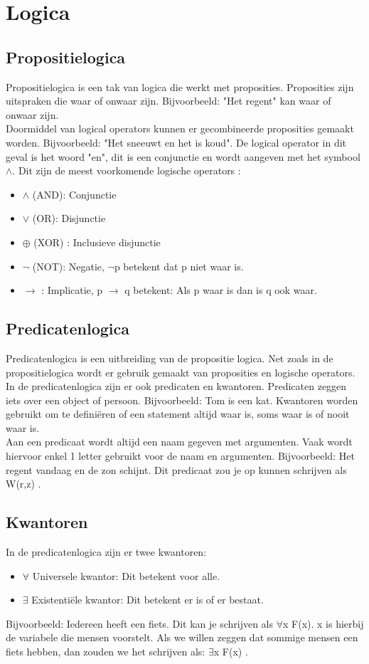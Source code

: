 \section{Logica}

\subsection{Propositielogica}
Propositielogica is een tak van logica die werkt met proposities. Proposities zijn uitspraken die waar of onwaar zijn. Bijvoorbeeld: "Het regent" kan waar of onwaar zijn. \\ Doormiddel van logical operators kunnen er gecombineerde proposities gemaakt worden. Bijvoorbeeld: "Het sneeuwt en het is koud". De logical operator in dit geval is het woord "en", dit is een conjunctie en wordt aangeven met het symbool $\wedge$. Dit zijn de meest voorkomende logische operators \cite{schaumsOutline}:
\begin{itemize}
\item $\wedge$ (AND): Conjunctie
\item  $\vee$ (OR): Disjunctie
\item  $\oplus$ (XOR) : Inclusieve disjunctie
\item  $\lnot$ (NOT): Negatie, $\lnot$p betekent dat p niet waar is.
\item  $\to$ : Implicatie, p $\to$ q betekent: Als p waar is dan is q ook waar.
\end{itemize}
\subsection{Predicatenlogica}
Predicatenlogica is een uitbreiding van de propositie logica. Net zoals in de propositielogica wordt er gebruik gemaakt van proposities en logische operators. In de predicatenlogica zijn er ook predicaten en kwantoren. Predicaten zeggen iets over een object of persoon. Bijvoorbeeld: Tom is een kat. Kwantoren worden gebruikt om te definiëren of een statement altijd waar is, soms waar is of nooit waar is. \\ Aan een predicaat wordt altijd een naam gegeven met argumenten. Vaak wordt hiervoor enkel 1 letter gebruikt voor de naam en argumenten. Bijvoorbeeld: Het regent vandaag en de zon schijnt. Dit predicaat zou je op kunnen schrijven als W(r,z) \cite{predicatelogic}.

\subsection{Kwantoren}
In de predicatenlogica zijn er twee kwantoren:
\begin{itemize}
\item $\forall$ Universele kwantor: Dit betekent voor alle.
\item $\exists$ Existentiële kwantor: Dit betekent er is of er bestaat. 
\end{itemize} 
Bijvoorbeeld: Iedereen heeft een fiets. Dit kan je schrijven als $\forall$x F(x). x is hierbij de variabele die mensen voorstelt. Als we willen zeggen dat sommige mensen een fiets hebben, dan zouden we het schrijven als: $\exists$x F(x) \cite{predicatelogic}.
